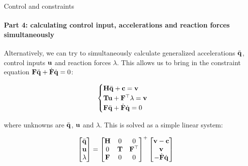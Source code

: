 \documentclass{beamer}
\begin{document}
\begin{frame}{Control and constraints}
\framesubtitle{Part 4: calculating control input, accelerations and reaction forces simultaneously}
\begin{flushleft}

Alternatively, we can try to simultaneously calculate generalized accelerations $\ddot{\mathbf{q}}$, control inputs $\mathbf{u}$ and reaction forces $\lambda$. This allows us to bring in the constraint equation $\mathbf{F} \ddot{\mathbf{q}} + \dot{\mathbf{F}} \dot{\mathbf{q}} = 0$:

\begin{equation}
\begin{cases}
    \mathbf{H} \ddot{\mathbf{q}} + \mathbf{c} = \mathbf{v}\\
    \mathbf{T}\mathbf{u} + \mathbf{F}^\top \lambda = \mathbf{v} \\
    \mathbf{F} \ddot{\mathbf{q}} + \dot{\mathbf{F}} \dot{\mathbf{q}} = 0
\end{cases}
\end{equation}

where unknowns are $\ddot{\mathbf{q}}$, $\mathbf{u}$ and $\lambda$. This is solved as a simple linear system:

\begin{equation}
    \begin{bmatrix}
        \ddot{\mathbf{q}} \\
        \mathbf{u} \\
        \lambda \\
    \end{bmatrix} 
    =
    \begin{bmatrix}
        \mathbf{H} & 0 & 0 \\
        0 & \mathbf{T} & \mathbf{F}^\top \\
        \mathbf{F} & 0 & 0 \\
    \end{bmatrix}^+
    \begin{bmatrix}
        \mathbf{v} - \mathbf{c} \\
        \mathbf{v} \\
        -\dot{\mathbf{F}} \dot{\mathbf{q}} \\
    \end{bmatrix}    
\end{equation}

\end{flushleft}
\end{frame}
\end{document}
